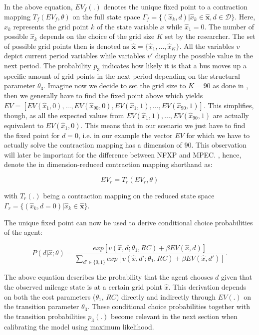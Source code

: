 In the above equation, $EV_f(.)$ denotes the unique fixed point to a contraction mapping $T_f(EV_f, \theta)$ on the full state space $\Gamma_f = \{(\hat x_k, d)|\hat x_k \in \mathbf{\hat x}, d \in \mathcal{D}\}$. Here, $\hat x_k$ represents the grid point $k$ of the state variable $x$ while $\hat x_1 = 0$. The number of possible $\hat x_k$ depends on the choice of the grid size $K$ set by the researcher. The set of possible grid points then is denoted as $\mathbf{\hat x} = \{\hat x_1, ..., \hat x_K\}$. All the variables $v$ depict current period variables while variables $v'$ display the possible value in the next period. The probability $p_3$ indicates how likely it is that a bus moves up a specific amount of grid points in the next period depending on the structural parameter $\theta_3$. Imagine now we decide to set the grid size to $K=90$ as done in \cite{Rust.1987}, then we generally have to find the fixed point above which yields $EV = [EV(\hat x_1, 0), ..., EV(\hat x_{90}, 0), EV(\hat x_1, 1), ..., EV(\hat x_{90}, 1)]$. This simplifies, though, as all the expected values from $EV(\hat x_1, 1), ..., EV(\hat x_{90}, 1)$ are actually equivalent to $EV(\hat x_1, 0)$. This means that in our scenario we just have to find the fixed point for $d=0$, i.e. in our example the vector $EV$ for which we have to actually solve the contraction mapping has a dimension of $90$. This observation will later be important for the difference between NFXP and MPEC. \cite{Su.Judd.2012}, hence, denote the in dimension-reduced contraction mapping shorthand as:

\begin{equation}
EV_r = T_r(EV_r, \theta)
\end{equation}  

with $T_r(.)$ being a contraction mapping on the reduced state space $\Gamma_r = \{(\hat x_k, d=0)|\hat x_k \in \mathbf{\hat x}\}$.

The unique fixed point can now be used to derive conditional choice probabilities of the agent: 

\begin{equation}
	\label{eq7}
	P(d|\hat x; \theta) = \frac{exp[v(\hat x, d; \theta_1, RC) + \beta EV(\hat x, d)]}{\sum_{d' \in \{0, 1\}} exp[v(\hat x, d'; \theta_1, RC) + \beta EV(\hat x, d')]}.
\end{equation}

The above equation describes the probability that the agent chooses $d$ given that the observed mileage state is at a certain grid point $\hat x$. This derivation depends on both the cost parameters ($\theta_1$, $RC$) directly and indirectly through $EV(.)$ on the transition parameter $\theta_3$. These conditional choice probabilities together with the transition probabilities $p_3(.)$ become relevant in the next section when calibrating the model using maximum likelihood. 


